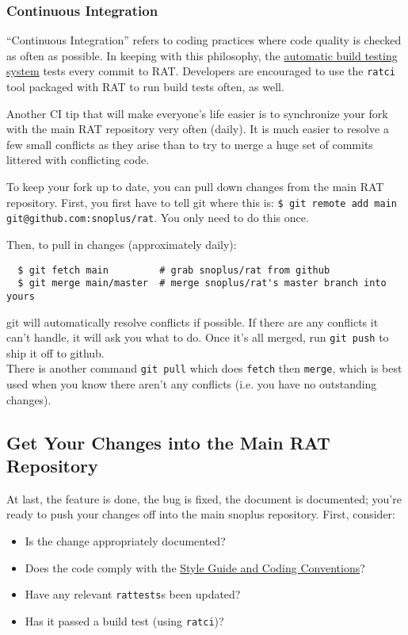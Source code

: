 \documentclass{article}
\begin{document}
\subsubsection{Continuous Integration}
``Continuous Integration'' refers to coding practices where code quality is checked as often as possible. In keeping with this philosophy, the \href{http://ratbuild.hep.upenn.edu/snoplus/build}{automatic build testing system} tests every commit to RAT. Developers are encouraged to use the {\tt ratci} tool packaged with RAT to run build tests often, as well.

Another CI tip that will make everyone's life easier is to synchronize your fork with the main RAT repository very often (daily). It is much easier to resolve a few small conflicts as they arise than to try to merge a huge set of commits littered with conflicting code.

To keep your fork up to date, you can pull down changes from the main RAT repository. First, you first have to tell git where this is: {\tt \$ git remote add main git@github.com:snoplus/rat}. You only need to do this once.

Then, to pull in changes (approximately daily):
\begin{verbatim}
  $ git fetch main         # grab snoplus/rat from github
  $ git merge main/master  # merge snoplus/rat's master branch into yours
\end{verbatim}
git will automatically resolve conflicts if possible. If there are any conflicts it can't handle, it will ask you what to do. Once it's all merged, run {\tt git push} to ship it off to github.\\

There is another command {\tt git pull} which does {\tt fetch} then {\tt merge}, which is best used when you know there aren't any conflicts (i.e. you have no outstanding changes).

\subsection{Get Your Changes into the Main RAT Repository}
At last, the feature is done, the bug is fixed, the document is documented; you're ready to push your changes off into the main snoplus repository. First, consider:
\begin{itemize}
\item Is the change appropriately documented?
\item Does the code comply with the \href{https://www.snolab.ca/snoplus/private/DocDB/cgi/ShowDocument?docid=1018}{Style Guide and Coding Conventions}?
\item Have any relevant {\tt rattests}s been updated?
\item Has it passed a build test (using {\tt ratci})?
\end{itemize}
\end{document}
